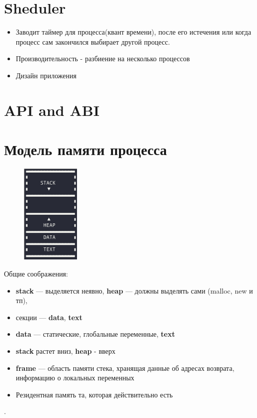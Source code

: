 \documentclass[../../lectures.tex]{subfiles}
\begin{document}
\section{Sheduler}
\begin{itemize}
    \item Заводит таймер для процесса(квант времени), после его истечения 
    или когда процесс сам закончился выбирает другой процесс.

    \item Производительность - разбиение на несколько процессов

    \item Дизайн приложения
\end{itemize}

\section{API and ABI}
\todo{}

\newpage
\section{Модель памяти процесса}
\begin{figure}
    \includegraphics[width=0.25\textwidth]{images/memory.png}
\end{figure}
\hspace{15pt} Общие соображения:
\begin{itemize}
    \item \textbf{stack} --- выделяется неявно, \textbf{heap} --- должны выделять сами (malloc, new и тп),
    \item секции --- \textbf{data}, \textbf{text}
    \item \textbf{data} --- статические, глобальные переменные, \textbf{text}
    \item \textbf{stack} растет вниз, \textbf{heap} - вверх
    \item \textbf{frame} --- область памяти стека, хранящая данные об адресах возврата, информацию о локальных переменных
    \item Резидентная память та, которая действительно есть
\end{itemize}
.\\
\end{document}
